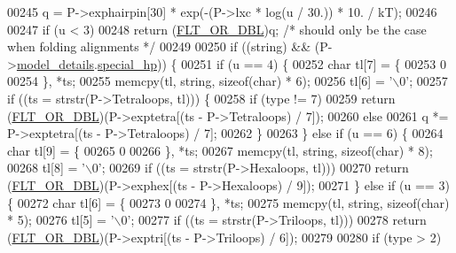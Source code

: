 \begin{DoxyCode}
00245     q = P->exphairpin[30] * exp(-(P->lxc * log(u / 30.)) * 10. / kT);
00246 
00247   \textcolor{keywordflow}{if} (u < 3)
00248     \textcolor{keywordflow}{return} (\hyperlink{group__data__structures_ga31125aeace516926bf7f251f759b6126}{FLT\_OR\_DBL})q;         \textcolor{comment}{/* should only be the case when folding alignments */}
00249 
00250   \textcolor{keywordflow}{if} ((\textcolor{keywordtype}{string}) && (P->\hyperlink{group__energy__parameters_ac18055127bccc27c1223f1d2f3b01b53}{model\_details}.\hyperlink{group__model__details_add64a96d23e77ef1d0ddf8dfc5228143}{special\_hp})) \{
00251     \textcolor{keywordflow}{if} (u == 4) \{
00252       \textcolor{keywordtype}{char} tl[7] = \{
00253         0
00254       \}, *ts;
00255       memcpy(tl, \textcolor{keywordtype}{string}, \textcolor{keyword}{sizeof}(\textcolor{keywordtype}{char}) * 6);
00256       tl[6] = \textcolor{charliteral}{'\(\backslash\)0'};
00257       \textcolor{keywordflow}{if} ((ts = strstr(P->Tetraloops, tl))) \{
00258         \textcolor{keywordflow}{if} (type != 7)
00259           \textcolor{keywordflow}{return} (\hyperlink{group__data__structures_ga31125aeace516926bf7f251f759b6126}{FLT\_OR\_DBL})(P->exptetra[(ts - P->Tetraloops) / 7]);
00260         \textcolor{keywordflow}{else}
00261           q *= P->exptetra[(ts - P->Tetraloops) / 7];
00262       \}
00263     \} \textcolor{keywordflow}{else} \textcolor{keywordflow}{if} (u == 6) \{
00264       \textcolor{keywordtype}{char} tl[9] = \{
00265         0
00266       \}, *ts;
00267       memcpy(tl, \textcolor{keywordtype}{string}, \textcolor{keyword}{sizeof}(\textcolor{keywordtype}{char}) * 8);
00268       tl[8] = \textcolor{charliteral}{'\(\backslash\)0'};
00269       \textcolor{keywordflow}{if} ((ts = strstr(P->Hexaloops, tl)))
00270         \textcolor{keywordflow}{return} (\hyperlink{group__data__structures_ga31125aeace516926bf7f251f759b6126}{FLT\_OR\_DBL})(P->exphex[(ts - P->Hexaloops) / 9]);
00271     \} \textcolor{keywordflow}{else} \textcolor{keywordflow}{if} (u == 3) \{
00272       \textcolor{keywordtype}{char} tl[6] = \{
00273         0
00274       \}, *ts;
00275       memcpy(tl, \textcolor{keywordtype}{string}, \textcolor{keyword}{sizeof}(\textcolor{keywordtype}{char}) * 5);
00276       tl[5] = \textcolor{charliteral}{'\(\backslash\)0'};
00277       \textcolor{keywordflow}{if} ((ts = strstr(P->Triloops, tl)))
00278         \textcolor{keywordflow}{return} (\hyperlink{group__data__structures_ga31125aeace516926bf7f251f759b6126}{FLT\_OR\_DBL})(P->exptri[(ts - P->Triloops) / 6]);
00279 
00280       \textcolor{keywordflow}{if} (type > 2)

\end{DoxyCode}
